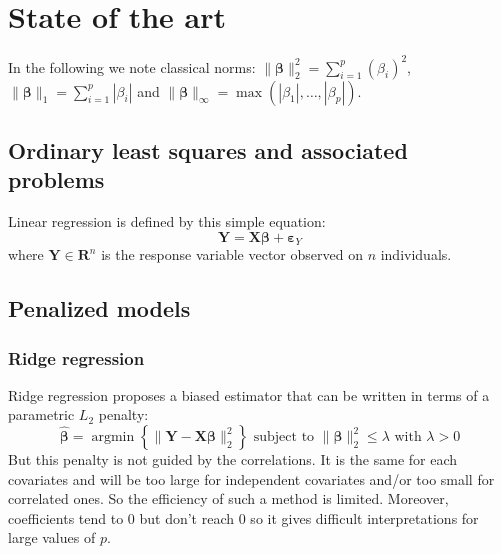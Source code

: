 \documentclass[11pt,a4paper]{report}
\begin{document}
	
\chapter{State of the art}
In the following we note classical norms: $\parallel\boldsymbol{\beta}\parallel_2^2=\sum_{i=1}^p(\beta_i)^2$, $\parallel\boldsymbol{\beta} \parallel_1=\sum_{i=1}^p|\beta_i| $ and $\parallel\boldsymbol{\beta} \parallel_{\infty}=\operatorname{max}(|\beta_1|,\dots,|\beta_p|)$.
	\section{Ordinary least squares and associated problems}
	Linear regression is defined by this simple equation:
	\begin{equation}
		\boldsymbol{Y}=\boldsymbol{X}\boldsymbol{\beta}+\boldsymbol{\varepsilon}_Y
	\end{equation}
	where $\boldsymbol{Y}\in \mathbf{R}^n$ is the response variable vector observed on $n$ individuals. 
	\section{Penalized models}
		\subsection{Ridge regression}
Ridge regression \cite{marquardt1975ridge} proposes a biased estimator that can be written in terms of a parametric $L_2$ penalty:
	\begin{equation}
		 \boldsymbol{\hat{\beta}}=\operatorname{argmin} \left\lbrace \parallel \boldsymbol{Y}-\boldsymbol{X\beta}\parallel_2^2 \right\rbrace \textrm{ subject to } \parallel \boldsymbol{\beta} \parallel_2^2\leq \lambda \textrm{ with } \lambda>0
	\end{equation}
	But this penalty is not guided by the correlations. It is the same for each covariates and will be too large for independent covariates and/or too small for correlated ones. So the efficiency of such a method is limited. 
	Moreover, coefficients tend to 0 but don't reach 0 so it gives difficult interpretations for large values of $p$. 
				
			
\end{document}
